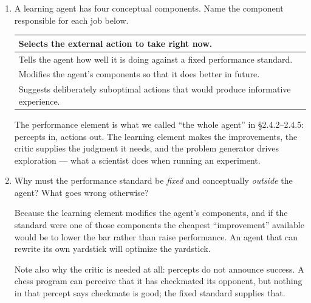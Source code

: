 \newpage

\begin{enumerate}
\item A learning agent has four conceptual components. Name the component responsible for each
job below.

\begin{center}
\renewcommand{\arraystretch}{1.9}
\begin{tabular}{p{9.5cm}|p{4.5cm}}
\toprule
Selects the external action to take right now. & \A{Performance element} \\
\hline
Tells the agent how well it is doing against a fixed performance standard. & \A{Critic} \\
\hline
Modifies the agent's components so that it does better in future. & \A{Learning element} \\
\hline
Suggests deliberately suboptimal actions that would produce informative experience. & \A{Problem generator} \\
\bottomrule
\end{tabular}
\end{center}

\begin{sol}
The performance element is what we called ``the whole agent'' in \S 2.4.2--2.4.5: percepts in,
actions out. The learning element makes the improvements, the critic supplies the judgment it
needs, and the problem generator drives exploration --- what a scientist does when running an
experiment.
\end{sol}

\item Why must the performance standard be \emph{fixed} and conceptually \emph{outside} the
agent? What goes wrong otherwise?
\ansspace{3.0cm}
\begin{sol}
Because the learning element modifies the agent's components, and if the standard were one of
those components the cheapest ``improvement'' available would be to lower the bar rather than
raise performance. An agent that can rewrite its own yardstick will optimize the yardstick.

Note also why the critic is needed at all: percepts do not announce success. A chess program
can perceive that it has checkmated its opponent, but nothing in that percept says checkmate is
good; the fixed standard supplies that.
\end{sol}


\end{enumerate}
